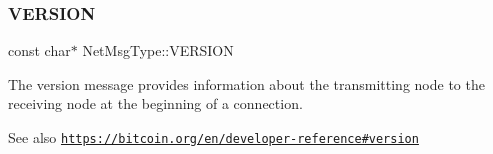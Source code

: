 \subsubsection{\texorpdfstring{V\+E\+R\+S\+I\+ON}{VERSION}}
{\footnotesize\ttfamily const char$\ast$ Net\+Msg\+Type\+::\+V\+E\+R\+S\+I\+ON}

The version message provides information about the transmitting node to the receiving node at the beginning of a connection. \begin{DoxySeeAlso}{See also}
\href{https://bitcoin.org/en/developer-reference#version}{\tt https\+://bitcoin.\+org/en/developer-\/reference\#version} 
\end{DoxySeeAlso}
